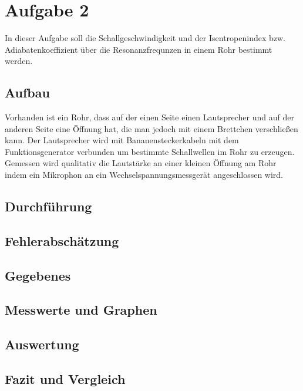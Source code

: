 \newpage
\section{Aufgabe 2}
In dieser Aufgabe soll die Schallgeschwindigkeit und der Isentropenindex bzw. Adiabatenkoeffizient über die Resonanzfrequnzen in einem Rohr bestimmt werden.
\subsection{Aufbau}
Vorhanden ist ein Rohr, dass auf der einen Seite einen Lautsprecher und auf der anderen Seite eine Öffnung hat, die man jedoch mit einem Brettchen verschließen kann. Der Lautsprecher wird mit Bananensteckerkabeln mit dem Funktionsgenerator verbunden um bestimmte Schallwellen im Rohr zu erzeugen. Gemessen wird qualitativ die Lautstärke an einer kleinen Öffnung am Rohr indem ein Mikrophon an ein Wechselspannungsmessgerät angeschlossen wird.
\subsection{Durchführung}

\subsection{Fehlerabschätzung}
\subsection{Gegebenes}
\subsection{Messwerte und Graphen}
\subsection{Auswertung}
\subsection{Fazit und Vergleich}